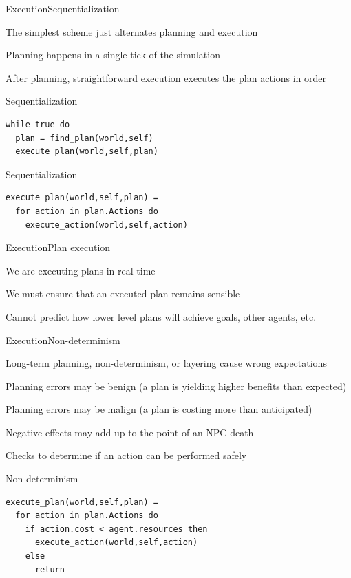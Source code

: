 \documentclass{beamer}
\begin{document}
\begin{slide}{Execution}{Sequentialization}{
\item The simplest scheme just alternates planning and execution
\item Planning happens in a single tick of the simulation
\item After planning, straightforward execution executes the plan actions in order
}\end{slide}

\begin{frame}[fragile]{Sequentialization}
\begin{lstlisting}
while true do
  plan = find_plan(world,self)
  execute_plan(world,self,plan)
\end{lstlisting}
\end{frame}

\begin{frame}[fragile]{Sequentialization}
\begin{lstlisting}
execute_plan(world,self,plan) =
  for action in plan.Actions do
    execute_action(world,self,action)
\end{lstlisting}
\end{frame}

\begin{slide}{Execution}{Plan execution}{
\item We are executing plans in real-time
\item We must ensure that an executed plan remains sensible
\item Cannot predict how lower level plans will achieve goals, other agents, etc.
}\end{slide}

\begin{slide}{Execution}{Non-determinism}{
\item Long-term planning, non-determinism, or layering cause wrong expectations
\item Planning errors may be benign (a plan is yielding higher benefits than expected) 
\item Planning errors may be malign (a plan is costing more than anticipated)
\item Negative effects may add up to the point of an NPC death
\item Checks to determine if an action can be performed safely
}\end{slide}

\begin{frame}[fragile]{Non-determinism}
\begin{lstlisting}
execute_plan(world,self,plan) =
  for action in plan.Actions do
    if action.cost < agent.resources then
      execute_action(world,self,action)
    else
      return
\end{lstlisting}
\end{frame}
\end{document}
